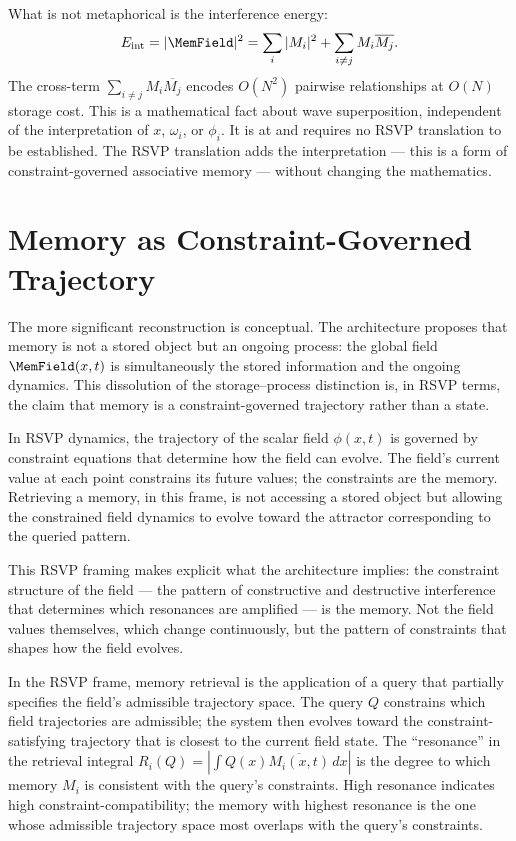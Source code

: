 What is not metaphorical is the interference energy:
\[
  E_{\mathrm{int}} = |\MemField|^2
  = \sum_i |M_i|^2 + \sum_{i \neq j} M_i\overline{M_j}.
\]
The cross-term $\sum_{i \neq j} M_i\overline{M_j}$
encodes $O(N^2)$ pairwise relationships at $O(N)$
storage cost. This is a mathematical fact about wave
superposition, independent of the interpretation of
$x$, $\omega_i$, or $\phi_i$. It is at \LevelI{} and
requires no RSVP translation to be established. The
RSVP translation adds the interpretation --- this is
a form of constraint-governed associative memory ---
without changing the mathematics.

\section{Memory as Constraint-Governed Trajectory}
\label{sec:memory-trajectory}

The more significant reconstruction is conceptual.
The \MEMeight{} architecture proposes that memory is
not a stored object but an ongoing process: the global
field $\MemField(x,t)$ is simultaneously the stored
information and the ongoing dynamics. This dissolution
of the storage--process distinction is, in RSVP terms,
the claim that memory is a constraint-governed trajectory
rather than a state.

In RSVP dynamics, the trajectory of the scalar field
$\phi(x,t)$ is governed by constraint equations that
determine how the field can evolve. The field's current
value at each point constrains its future values;
the constraints are the memory. Retrieving a memory,
in this frame, is not accessing a stored object but
allowing the constrained field dynamics to evolve
toward the attractor corresponding to the queried
pattern.

This RSVP framing makes explicit what the \MEMeight{}
architecture implies: the constraint structure of the
field --- the pattern of constructive and destructive
interference that determines which resonances are
amplified --- is the memory. Not the field values
themselves, which change continuously, but the pattern
of constraints that shapes how the field evolves.

\begin{salvage}
In the RSVP frame, memory retrieval is the application
of a query that partially specifies the field's
admissible trajectory space. The query $Q$ constrains
which field trajectories are admissible; the system
then evolves toward the constraint-satisfying trajectory
that is closest to the current field state. The
``resonance'' in the \MEMeight{} retrieval integral
$R_i(Q) = |\int Q(x)\overline{M_i(x,t)}\,dx|$ is
the degree to which memory $M_i$ is consistent with
the query's constraints. High resonance indicates
high constraint-compatibility; the memory with highest
resonance is the one whose admissible trajectory space
most overlaps with the query's constraints.
\end{salvage}

